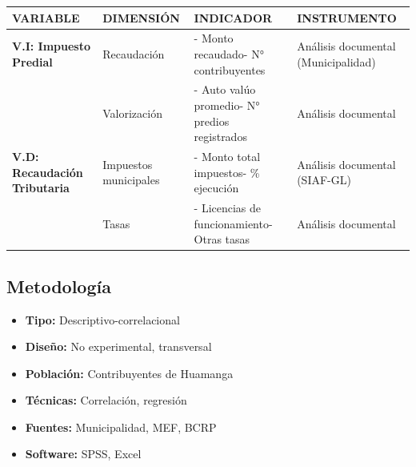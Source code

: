 \documentclass[
  man,
  floatsintext,
  longtable,
  a4paper,
  nolmodern,
  notxfonts,
  notimes,
  12pt,
  colorlinks=true,linkcolor=blue,citecolor=blue,urlcolor=blue]{apa7}
\providecommand{\tightlist}{%
  \setlength{\itemsep}{0pt}\setlength{\parskip}{0pt}}
\newcounter{none} %
\begin{document}
{\def\LTcaptype{none} %
\begin{longtable}[]{@{}
  >{\raggedright\arraybackslash}p{}
  >{\raggedright\arraybackslash}p{}
  >{\raggedright\arraybackslash}p{}
  >{\raggedright\arraybackslash}p{}@{}}
\toprule\noalign{}
\begin{minipage}[b]{\linewidth}\raggedright
VARIABLE
\end{minipage} & \begin{minipage}[b]{\linewidth}\raggedright
DIMENSIÓN
\end{minipage} & \begin{minipage}[b]{\linewidth}\raggedright
INDICADOR
\end{minipage} & \begin{minipage}[b]{\linewidth}\raggedright
INSTRUMENTO
\end{minipage} \\
\midrule\noalign{}
\endhead
\bottomrule\noalign{}
\endlastfoot
\textbf{V.I: Impuesto Predial} & Recaudación & - Monto recaudado- N°
contribuyentes & Análisis documental (Municipalidad) \\
& Valorización & - Auto valúo promedio- N° predios registrados &
Análisis documental \\
\textbf{V.D: Recaudación Tributaria} & Impuestos municipales & - Monto
total impuestos- \% ejecución & Análisis documental (SIAF-GL) \\
& Tasas & - Licencias de funcionamiento- Otras tasas & Análisis
documental \\
\end{longtable}
}

\subsection{Metodología}\label{metodologuxeda-11}

\begin{itemize}
\tightlist
\item
  \textbf{Tipo:} Descriptivo-correlacional
\item
  \textbf{Diseño:} No experimental, transversal
\item
  \textbf{Población:} Contribuyentes de Huamanga
\item
  \textbf{Técnicas:} Correlación, regresión
\item
  \textbf{Fuentes:} Municipalidad, MEF, BCRP
\item
  \textbf{Software:} SPSS, Excel
\end{itemize}
\end{document}
